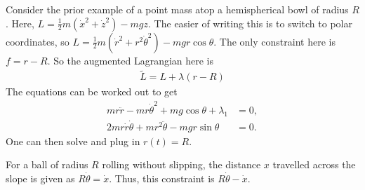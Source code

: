 \begin{example}
    Consider the prior example of a point mass atop a hemispherical bowl of radius $R$. Here, $L = \frac{1}{2}m(\dot{x}^{2}+\dot{z}^{2}) - mgz$. The easier of writing this is to switch to polar coordinates, so $L = \frac{1}{2}m(\dot{r}^{2}+r^{2}\dot{\theta}^{2}) - mgr \cos \theta$. The only constraint here is $f = r - R$. So the augmented Lagrangian here is
    \begin{align}
        \tilde{L} = L + \lambda(r-R)
    \end{align}
    The equations can be worked out to get
    \begin{align}
        mr\ddot{r}-mr\dot{\theta}^{2} + mg\cos\theta + \lambda_{1} &= 0,\\
        2mr\dot{r}\dot{\theta} + mr^{2}\ddot{\theta} - mgr\sin\theta &= 0.
    \end{align}
    One can then solve and plug in $r(t) = R$.
\end{example}

\begin{example}
    For a ball of radius $R$ rolling without slipping, the distance $x$ travelled across the slope is given as $R\dot{\theta} = \dot{x}$. Thus, this constraint is $R\dot{\theta} - \dot{x}$.
\end{example}